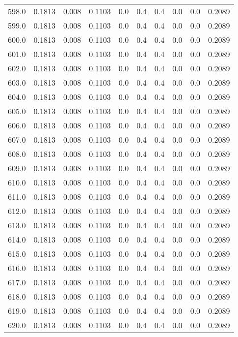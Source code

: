 \begin{longtable}{lrrrrrrrrr}
598.0 & 0.1813 & 0.008 & 0.1103 & 0.0 & 0.4 & 0.4 & 0.0 & 0.0 & 0.2089 \\
599.0 & 0.1813 & 0.008 & 0.1103 & 0.0 & 0.4 & 0.4 & 0.0 & 0.0 & 0.2089 \\
600.0 & 0.1813 & 0.008 & 0.1103 & 0.0 & 0.4 & 0.4 & 0.0 & 0.0 & 0.2089 \\
601.0 & 0.1813 & 0.008 & 0.1103 & 0.0 & 0.4 & 0.4 & 0.0 & 0.0 & 0.2089 \\
602.0 & 0.1813 & 0.008 & 0.1103 & 0.0 & 0.4 & 0.4 & 0.0 & 0.0 & 0.2089 \\
603.0 & 0.1813 & 0.008 & 0.1103 & 0.0 & 0.4 & 0.4 & 0.0 & 0.0 & 0.2089 \\
604.0 & 0.1813 & 0.008 & 0.1103 & 0.0 & 0.4 & 0.4 & 0.0 & 0.0 & 0.2089 \\
605.0 & 0.1813 & 0.008 & 0.1103 & 0.0 & 0.4 & 0.4 & 0.0 & 0.0 & 0.2089 \\
606.0 & 0.1813 & 0.008 & 0.1103 & 0.0 & 0.4 & 0.4 & 0.0 & 0.0 & 0.2089 \\
607.0 & 0.1813 & 0.008 & 0.1103 & 0.0 & 0.4 & 0.4 & 0.0 & 0.0 & 0.2089 \\
608.0 & 0.1813 & 0.008 & 0.1103 & 0.0 & 0.4 & 0.4 & 0.0 & 0.0 & 0.2089 \\
609.0 & 0.1813 & 0.008 & 0.1103 & 0.0 & 0.4 & 0.4 & 0.0 & 0.0 & 0.2089 \\
610.0 & 0.1813 & 0.008 & 0.1103 & 0.0 & 0.4 & 0.4 & 0.0 & 0.0 & 0.2089 \\
611.0 & 0.1813 & 0.008 & 0.1103 & 0.0 & 0.4 & 0.4 & 0.0 & 0.0 & 0.2089 \\
612.0 & 0.1813 & 0.008 & 0.1103 & 0.0 & 0.4 & 0.4 & 0.0 & 0.0 & 0.2089 \\
613.0 & 0.1813 & 0.008 & 0.1103 & 0.0 & 0.4 & 0.4 & 0.0 & 0.0 & 0.2089 \\
614.0 & 0.1813 & 0.008 & 0.1103 & 0.0 & 0.4 & 0.4 & 0.0 & 0.0 & 0.2089 \\
615.0 & 0.1813 & 0.008 & 0.1103 & 0.0 & 0.4 & 0.4 & 0.0 & 0.0 & 0.2089 \\
616.0 & 0.1813 & 0.008 & 0.1103 & 0.0 & 0.4 & 0.4 & 0.0 & 0.0 & 0.2089 \\
617.0 & 0.1813 & 0.008 & 0.1103 & 0.0 & 0.4 & 0.4 & 0.0 & 0.0 & 0.2089 \\
618.0 & 0.1813 & 0.008 & 0.1103 & 0.0 & 0.4 & 0.4 & 0.0 & 0.0 & 0.2089 \\
619.0 & 0.1813 & 0.008 & 0.1103 & 0.0 & 0.4 & 0.4 & 0.0 & 0.0 & 0.2089 \\
620.0 & 0.1813 & 0.008 & 0.1103 & 0.0 & 0.4 & 0.4 & 0.0 & 0.0 & 0.2089 \\

\end{longtable}
